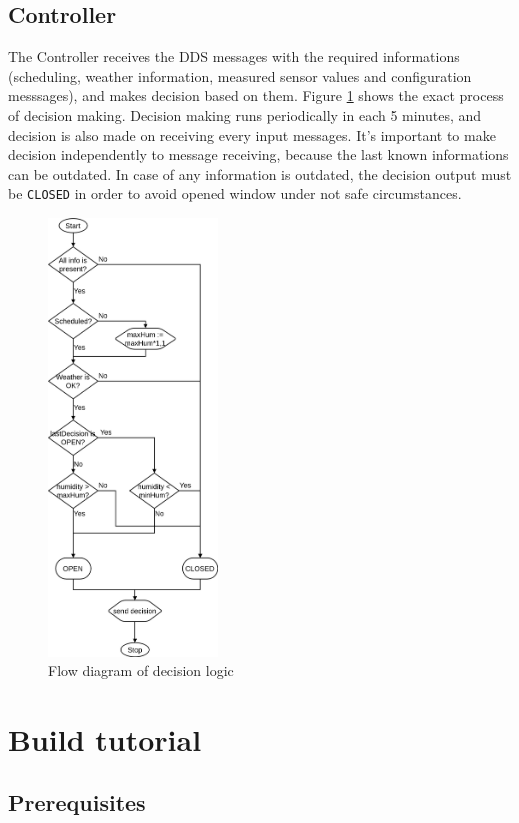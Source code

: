 \documentclass{article}
\begin{document}
\subsection{Controller}
The Controller receives the DDS messages with the required informations (scheduling, weather information, measured sensor values and configuration messsages), and makes decision based on them. Figure \ref{fig:decision_logic} shows the exact process of decision making. Decision making runs periodically in each 5 minutes, and decision is also made on receiving every input messages. It's important to make decision independently to message receiving, because the last known informations can be outdated. In case of any information is outdated, the decision output must be \verb+CLOSED+ in order to avoid opened window under not safe circumstances.
\begin{figure}[!htb]
\centering
  \includegraphics[width=170px]{imgs/decision_logic.png}
  \caption{Flow diagram of decision logic}
  \label{fig:decision_logic}
\end{figure} 

\section{Build tutorial}
\subsection{Prerequisites}
\end{document}
